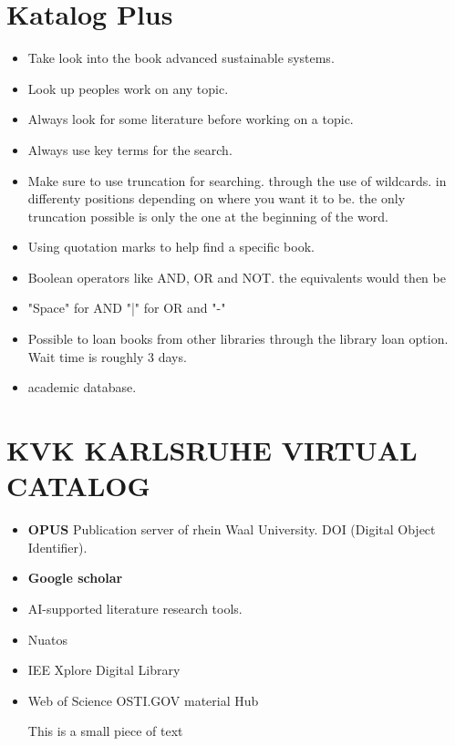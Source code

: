 \documentclass[11pt, a4paper]{article}
\begin{document}
\setcounter{page}{1}

\tableofcontents
\newpage
{}
\setcounter{page}{1}
\section{Katalog Plus}
\begin{itemize}
  \item Take look into the book  advanced sustainable systems.
  \item Look up peoples work on any topic.
  \item Always look for some literature before working on a topic.
  \item Always use key terms for the search.
  \item Make sure to use truncation for searching. through the use of wildcards.
        in differenty positions depending on where you want it to be.
        the only truncation possible is only the one at the beginning of the word.

  \item Using quotation marks to help find a specific book.
  \item Boolean operators  like AND, OR and NOT. the equivalents would then be
  \item "Space" for AND "|" for OR and "-"
  \item Possible to loan books from other libraries through the library loan option. Wait time is
        roughly 3 days.
  \item academic database.
\end{itemize}

\section{KVK KARLSRUHE VIRTUAL CATALOG}
\begin{itemize}
  \item \textbf{OPUS} Publication server of rhein Waal University.
        DOI (Digital Object Identifier).
  \item \textbf{Google scholar}
  \item AI-supported literature research tools.
  \item Nuatos
  \item IEE Xplore Digital Library
  \item Web of Science
        OSTI.GOV
        material Hub

        This is a small piece of text
\end{itemize}
\end{document}

